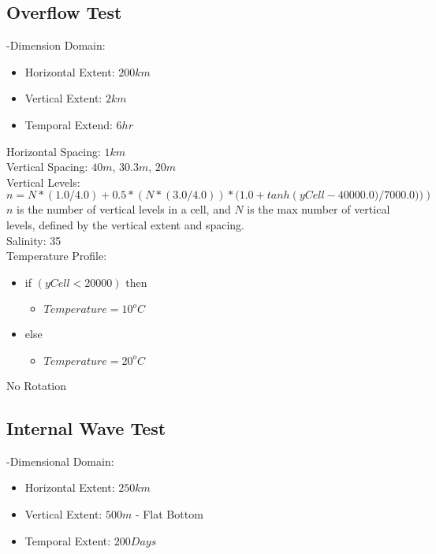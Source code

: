 \documentclass[11pt]{report}
\begin{document}
\subsection{Overflow Test}

-Dimension Domain:
\begin{itemize}
	\item Horizontal Extent: $200km$
	\item Vertical Extent: $2km$
	\item Temporal Extend: $6hr$
\end{itemize}

\noindent Horizontal Spacing: $1km$ \\
\noindent Vertical Spacing: $40m$, $30.3m$, $20m$ \\

\noindent Vertical Levels:
\begin{equation}
	n = N * (1.0/4.0) + 0.5 * (N * (3.0/4.0)) * (1.0 + tanh\left( yCell - 40000.0)/7000.0)) \right)
\end{equation}
\noindent $n$ is the number of vertical levels in a cell, and $N$ is the max number of vertical levels, defined by the vertical extent and spacing. \\

\noindent Salinity: 35 \\
\noindent Temperature Profile:
\begin{itemize}
	\item if $( yCell < 20000 )$ then
		\begin{itemize}
			\item $Temperature = 10^oC$
		\end{itemize}
	\item else 
		\begin{itemize}
			\item $Temperature = 20^oC$
		\end{itemize}
\end{itemize}

\noindent No Rotation \\

\subsection{Internal Wave Test}

-Dimensional Domain:
\begin{itemize}
	\item Horizontal Extent: $250km$
	\item Vertical Extent: $500m$ - Flat Bottom
	\item Temporal Extent: $200 Days$
\end{itemize}
\end{document}
